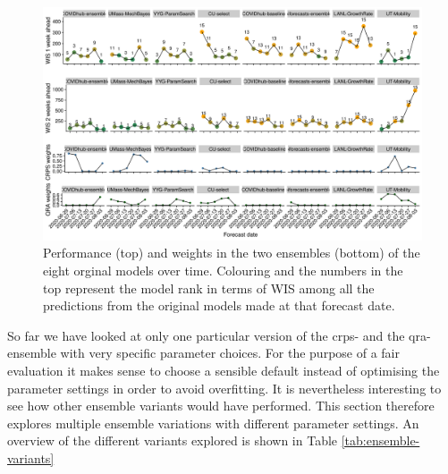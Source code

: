 \documentclass[
]{book}
\begin{document}
\begin{figure}
\includegraphics[width=1\linewidth]{../visualisation/chapter-5-results/weights-vs-wis} \caption{Performance (top) and weights in the two ensembles (bottom) of the eight orginal models over time. Colouring and the numbers in the top represent the model rank in terms of WIS among all the predictions from the original models made at that forecast date.}\label{fig:weights-vs-scores}
\end{figure}

So far we have looked at only one particular version of the crps- and the qra-ensemble with very specific parameter choices. For the purpose of a fair evaluation it makes sense to choose a sensible default instead of optimising the parameter settings in order to avoid overfitting. It is nevertheless interesting to see how other ensemble variants would have performed. This section therefore explores multiple ensemble variations with different parameter settings. An overview of the different variants explored is shown in Table \ref{tab:ensemble-variants}
\end{document}
